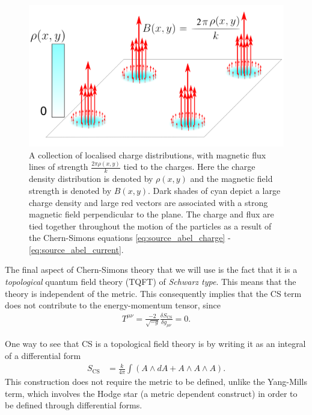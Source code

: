 \begin{figure}[htb]
	\centering
		\includegraphics[scale=0.17]{Background_Folder/figures/Flux_Attachment_3.pdf}
    \caption[This figure depicts magnetic flux attachment.]{A collection of localised charge distributions,  with magnetic flux lines of strength $\frac{2 \pi \rho(x,y)}{k}$ tied to the charges. Here the charge density distribution is denoted by $\rho(x,y)$ and the magnetic field strength is denoted by $B(x,y)$. Dark shades of cyan depict a large charge density and large red vectors are associated with a strong magnetic field perpendicular to the plane.  The charge and flux are tied together throughout the motion of the particles as a result of the Chern-Simons equations \eqref{eq:source_abel_charge} - \eqref{eq:source_abel_current}.} \label{fig:flux_attachment}
\end{figure}

The final aspect of Chern-Simons theory that we will use is the fact that it is a \textit{topological} quantum field theory (TQFT) of \textit{Schwarz type}. This means that the theory is independent of the metric. This consequently implies that the CS term does not contribute to the energy-momentum tensor, since
\begin{align}
    T^{\mu \nu} = \frac{-2}{ \sqrt{-g}} \frac{\delta S_{\text{CS}}}{ \delta g_{\mu\nu}} =0.
\end{align}

One way to see that CS is a topological field theory is by writing it as an integral of a differential form
\begin{align}
    S_{\text{CS}} &= \frac{k}{4 \pi} \int \left(A \wedge dA +A \wedge A \wedge A\right).
\end{align}
This construction does not require the metric to be defined, unlike the Yang-Mills term, which involves the Hodge star (a metric dependent construct) in order to be defined through differential forms.

